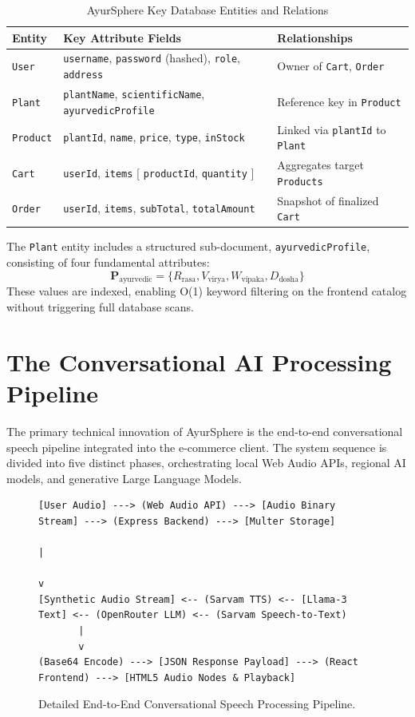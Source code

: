 \documentclass[conference]{IEEEtran}
\begin{document}
\begin{table}[htbp]
\caption{AyurSphere Key Database Entities and Relations}
\label{tab:database}
\centering
\begin{tabular}{@{}lll@{}}
\toprule
\textbf{Entity} & \textbf{Key Attribute Fields} & \textbf{Relationships} \\ \midrule
\texttt{User} & \texttt{username}, \texttt{password} (hashed), \texttt{role}, \texttt{address} & Owner of \texttt{Cart}, \texttt{Order} \\
\texttt{Plant} & \texttt{plantName}, \texttt{scientificName}, \texttt{ayurvedicProfile} & Reference key in \texttt{Product} \\
\texttt{Product} & \texttt{plantId}, \texttt{name}, \texttt{price}, \texttt{type}, \texttt{inStock} & Linked via \texttt{plantId} to \texttt{Plant} \\
\texttt{Cart} & \texttt{userId}, \texttt{items} [ \texttt{productId}, \texttt{quantity} ] & Aggregates target \texttt{Products} \\
\texttt{Order} & \texttt{userId}, \texttt{items}, \texttt{subTotal}, \texttt{totalAmount} & Snapshot of finalized \texttt{Cart} \\ \bottomrule
\end{tabular}
\end{table}

The \texttt{Plant} entity includes a structured sub-document, \texttt{ayurvedicProfile}, consisting of four fundamental attributes:
\begin{equation}
\mathbf{P}_{\text{ayurvedic}} = \{R_{\text{rasa}}, V_{\text{virya}}, W_{\text{vipaka}}, D_{\text{dosha}}\}
\end{equation}
These values are indexed, enabling O(1) keyword filtering on the frontend catalog without triggering full database scans.

\section{The Conversational AI Processing Pipeline}
The primary technical innovation of AyurSphere is the end-to-end conversational speech pipeline integrated into the e-commerce client. The system sequence is divided into five distinct phases, orchestrating local Web Audio APIs, regional AI models, and generative Large Language Models.

\begin{figure}[htbp]
\centering
\begin{lstlisting}[basicstyle=\ttfamily\footnotesize]
[User Audio] ---> (Web Audio API) ---> [Audio Binary Stream] ---> (Express Backend) ---> [Multer Storage]
                                                                                               |
                                                                                               v
[Synthetic Audio Stream] <-- (Sarvam TTS) <-- [Llama-3 Text] <-- (OpenRouter LLM) <-- (Sarvam Speech-to-Text)
       |
       v
(Base64 Encode) ---> [JSON Response Payload] ---> (React Frontend) ---> [HTML5 Audio Nodes & Playback]
\end{lstlisting}
\caption{Detailed End-to-End Conversational Speech Processing Pipeline.}
\label{fig:pipeline}
\end{figure}
\end{document}
